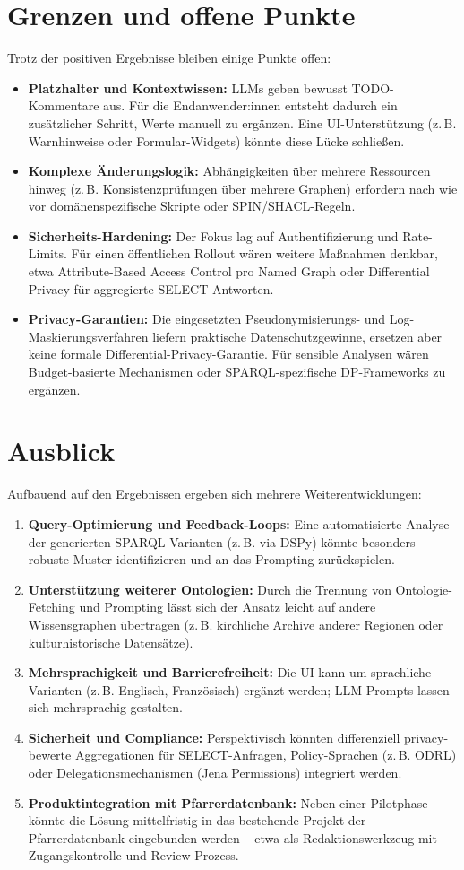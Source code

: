 \section{Grenzen und offene Punkte}
Trotz der positiven Ergebnisse bleiben einige Punkte offen:
\begin{itemize}
  \item \textbf{Platzhalter und Kontextwissen:} LLMs geben bewusst TODO-Kommentare aus. Für die Endanwender:innen entsteht dadurch ein zusätzlicher Schritt, Werte manuell zu ergänzen. Eine UI-Unterstützung (z.\,B. Warnhinweise oder Formular-Widgets) könnte diese Lücke schließen.
  \item \textbf{Komplexe Änderungslogik:} Abhängigkeiten über mehrere Ressourcen hinweg (z.\,B. Konsistenzprüfungen über mehrere Graphen) erfordern nach wie vor domänenspezifische Skripte oder SPIN/SHACL-Regeln.
  \item \textbf{Sicherheits-Hardening:} Der Fokus lag auf Authentifizierung und Rate-Limits. Für einen öffentlichen Rollout wären weitere Maßnahmen denkbar, etwa Attribute-Based Access Control pro Named Graph oder Differential Privacy für aggregierte SELECT-Antworten.
  \item \textbf{Privacy-Garantien:} Die eingesetzten Pseudonymisierungs- und Log-Maskierungsverfahren liefern praktische Datenschutzgewinne, ersetzen aber keine formale Differential-Privacy-Garantie. Für sensible Analysen wären Budget-basierte Mechanismen oder SPARQL-spezifische DP-Frameworks zu ergänzen.
\end{itemize}

\section{Ausblick}
Aufbauend auf den Ergebnissen ergeben sich mehrere Weiterentwicklungen:
\begin{enumerate}
  \item \textbf{Query-Optimierung und Feedback-Loops:} Eine automatisierte Analyse der generierten SPARQL-Varianten (z.\,B. via DSPy) könnte besonders robuste Muster identifizieren und an das Prompting zurückspielen.
  \item \textbf{Unterstützung weiterer Ontologien:} Durch die Trennung von Ontologie-Fetching und Prompting lässt sich der Ansatz leicht auf andere Wissensgraphen übertragen (z.\,B. kirchliche Archive anderer Regionen oder kulturhistorische Datensätze).
  \item \textbf{Mehrsprachigkeit und Barrierefreiheit:} Die UI kann um sprachliche Varianten (z.\,B. Englisch, Französisch) ergänzt werden; LLM-Prompts lassen sich mehrsprachig gestalten.
  \item \textbf{Sicherheit und Compliance:} Perspektivisch könnten differenziell privacy-bewerte Aggregationen für SELECT-Anfragen, Policy-Sprachen (z.\,B. ODRL) oder Delegationsmechanismen (Jena Permissions) integriert werden.
  \item \textbf{Produktintegration mit Pfarrerdatenbank:} Neben einer Pilotphase könnte die Lösung mittelfristig in das bestehende Projekt der Pfarrerdatenbank eingebunden werden – etwa als Redaktionswerkzeug mit Zugangskontrolle und Review-Prozess.
\end{enumerate}


